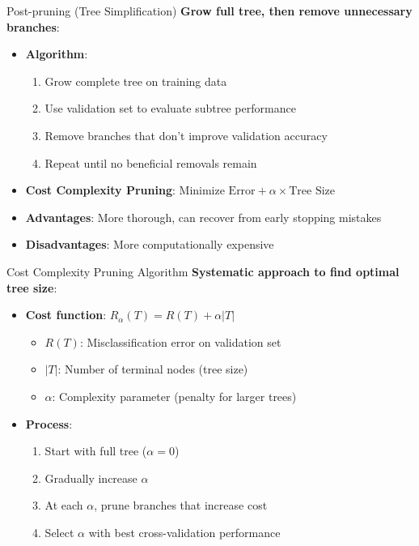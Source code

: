 \documentclass[usenames,dvipsnames]{beamer}
\begin{document}
\begin{frame}{Post-pruning (Tree Simplification)}
\textbf{Grow full tree, then remove unnecessary branches}:
\begin{itemize}
\item \textbf{Algorithm}:
    \begin{enumerate}
    \item Grow complete tree on training data
    \pause
\item Use validation set to evaluate subtree performance
    \item Remove branches that don't improve validation accuracy
    \item Repeat until no beneficial removals remain
    \end{enumerate}
\pause
\item \textbf{Cost Complexity Pruning}: Minimize $\text{Error} + \alpha \times \text{Tree Size}$
\pause
\item \textbf{Advantages}: More thorough, can recover from early stopping mistakes
\pause
\item \textbf{Disadvantages}: More computationally expensive
\end{itemize}
\end{frame}

\begin{frame}{Cost Complexity Pruning Algorithm}
\textbf{Systematic approach to find optimal tree size}:
\begin{itemize}
\item \textbf{Cost function}: $R_\alpha(T) = R(T) + \alpha |T|$
    \begin{itemize}
    \item $R(T)$: Misclassification error on validation set
    \pause
\item $|T|$: Number of terminal nodes (tree size)
    \item $\alpha$: Complexity parameter (penalty for larger trees)
    \end{itemize}
\item \textbf{Process}:
    \begin{enumerate}
    \item Start with full tree ($\alpha = 0$)
    \item Gradually increase $\alpha$
    \item At each $\alpha$, prune branches that increase cost
    \item Select $\alpha$ with best cross-validation performance
    \end{enumerate}
\end{itemize}
\end{frame}
\end{document}
